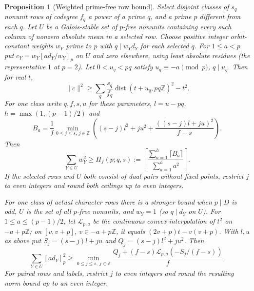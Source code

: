 \documentclass[11pt]{amsart}
\numberwithin{equation}{section}
\newtheorem{proposition}[theorem]{Proposition}
\theoremstyle{definition}
\theoremstyle{plain}
\newcommand{\ZZ}{\mathbb Z}
\begin{document}
\begin{proposition}[Weighted prime-free row bound]\label{sq:joint-projection}
Select disjoint classes of $s_q$ nonunit rows of codegree $f_q$ a
power of a prime $q$, and a prime $p$ different from each $q$. Let
$U$ be a Galois-stable set of $p$-free nonunits containing every
such column of nonzero absolute mean in a selected row. Choose
positive integer orbit-constant weights $w_Y$ prime to $p$ with
$q\mid w_Yd_Y$ for each selected $q$. For $1\le a<p$ put
$c_Y=w_Y[ad_Y/w_Y]_p$ on $U$ and zero elsewhere, using least
absolute residues (the representative $1$ at $p=2$).
Let $0<u_q<pq$ satisfy $u_q\equiv-a\pmod p$, $q\mid u_q$.
Then for real $t$,
\[
 \|c\|^2\ge\sum_q\frac{s_q}{f_q}
       \operatorname{dist}(t+u_q,pq\ZZ)^2-t^2 .
\]
For one class write $q,f,s,u$ for these parameters, $l=u-pq$,
$h=\max(1,(p-1)/2)$ and
\[
 B_a=\frac1f\min_{0\le j\le s,\ j\in\ZZ}
  \left((s-j)l^2+ju^2+\frac{((s-j)l+ju)^2}{f-s}\right).
\]
Then
\[
 \sum_{Y\in U}w_Y^2\ge
 H_f(p;q,s):=\left\lceil
 \frac{\sum_{a=1}^h\lceil B_a\rceil}{\sum_{a=1}^h a^2}
 \right\rceil .
\]
If the selected rows and $U$ both consist of dual pairs without
fixed points, restrict $j$ to even integers and round both ceilings
up to even integers.

For one class of actual character rows there is a stronger bound
when $p\mid D$ is odd, $U$ is the set of all $p$-free nonunits, and
$w_Y=1$ (so $q\mid d_Y$ on $U$). For $1\le a\le(p-1)/2$, let
$\mathcal L_{p,a}$ be the continuous convex interpolation of $t^2$
on $-a+p\ZZ$; on $[v,v+p]$, $v\in-a+p\ZZ$, it equals
$(2v+p)t-v(v+p)$. With $l,u$ as above put
$S_j=(s-j)l+ju$ and $Q_j=(s-j)l^2+ju^2$. Then
\begin{equation}\label{eq:full-census}
 \sum_{Y\in U}[ad_Y]_p^2\ge
 \min_{0\le j\le s,\ j\in\ZZ}
 \frac{Q_j+(f-s)\mathcal L_{p,a}(-S_j/(f-s))}{f}.
\end{equation}
For paired rows and labels, restrict $j$ to even integers and round
the resulting norm bound up to an even integer.
\end{proposition}
\end{document}
